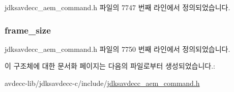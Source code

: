 jdksavdecc\+\_\+aem\+\_\+command.\+h 파일의 7747 번째 라인에서 정의되었습니다.

\subsubsection[{\texorpdfstring{frame\+\_\+size}{frame_size}}]{ frame\+\_\+size}\hypertarget{structjdksavdecc__aem__command__set__video__format_a0229abcfe4414f86dcf52c5ebf84311c}{}\label{structjdksavdecc__aem__command__set__video__format_a0229abcfe4414f86dcf52c5ebf84311c}


jdksavdecc\+\_\+aem\+\_\+command.\+h 파일의 7750 번째 라인에서 정의되었습니다.



이 구조체에 대한 문서화 페이지는 다음의 파일로부터 생성되었습니다.\+:\begin{DoxyCompactItemize}
\item 
avdecc-\/lib/jdksavdecc-\/c/include/\hyperlink{jdksavdecc__aem__command_8h}{jdksavdecc\+\_\+aem\+\_\+command.\+h}\end{DoxyCompactItemize}
